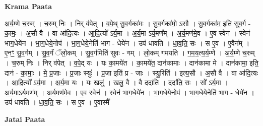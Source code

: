 \documentclass[17pt]{extarticle}
\begin{document}
\textbf{Krama Paata} \newline

अ॒र्य॒म्णे च॒रुम् । च॒रुम् निः । निर् व॑पेत् । व॒पे॒थ् सु॒व॒र्गका॑मः । सु॒व॒र्गका॑मो॒ ऽसौ । सु॒व॒र्गका॑म॒ इति॑ सुव॒र्ग - का॒मः॒ । अ॒सौ वै । वा आ॑दि॒त्यः । आ॒दि॒त्यो᳚ ऽर्य॒मा । अ॒र्य॒मा ऽर्य॒मण᳚म् । अ॒र्य॒मण॑मे॒व । ए॒व स्वेन॑ । स्वेन॑ भाग॒धेये॑न । भा॒ग॒धेये॒नोप॑ । भा॒ग॒धेये॒नेति॑ भाग - धेये॑न । उप॑ धावति । धा॒व॒ति॒ सः । स ए॒व । ए॒वैन᳚म् । ए॒नꣳ॒॒ सु॒व॒र्गम् । सु॒व॒र्गं ॅलो॒कम् । सु॒व॒र्गमिति॑ सुवः - गम् । लो॒कम् ग॑मयति । ग॒म॒य॒त्य॒र्य॒म्णे । अ॒र्य॒म्णे च॒रुम् । च॒रुम् निः । निर् व॑पेत् । व॒पे॒द् यः । यः का॒मये॑त । का॒मये॑त॒ दान॑कामाः । दान॑कामा मे । दान॑कामा॒ इति॒ दान॑ - का॒माः॒ । मे॒ प्र॒जाः । प्र॒जाः स्युः॑ । प्र॒जा इति॑ प्र - जाः । स्यु॒रिति॑ । इत्य॒सौ । अ॒सौ वै । वा आ॑दि॒त्यः । आ॒दि॒त्यो᳚ ऽर्य॒मा । अ॒र्य॒मा यः । यः खलु॑ । खलु॒ वै । वै ददा॑ति । ददा॑ति॒ सः । सो᳚ ऽर्य॒मा । अ॒र्य॒माऽर्य॒मण᳚म् । अ॒र्य॒मण॑मे॒व । ए॒व स्वेन॑ । स्वेन॑ भाग॒धेये॑न । भा॒ग॒धेये॒नोप॑ । भा॒ग॒धेये॒नेति॑ भाग - धेये॑न । उप॑ धावति । धा॒व॒ति॒ सः । स ए॒व । ए॒वास्मै᳚ \newline

\textbf{Jatai Paata} \newline
\end{document}
